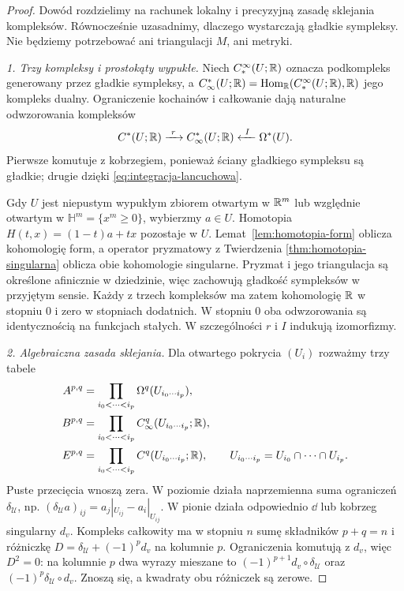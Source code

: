 \begin{proof}
Dowód rozdzielimy na rachunek lokalny i precyzyjną
zasadę sklejania kompleksów. Równocześnie uzasadnimy,
dlaczego wystarczają gładkie sympleksy. Nie będziemy
potrzebować ani triangulacji $M$, ani metryki.

\emph{1. Trzy kompleksy i prostokąty wypukłe.}
Niech $C_*^\infty(U;\mathbb{R})$ oznacza podkompleks
generowany przez gładkie sympleksy, a
$C_\infty^*(U;\mathbb{R})=\operatorname{Hom}_{\mathbb{R}}
(C_*^\infty(U;\mathbb{R}),\mathbb{R})$ jego kompleks dualny.
Ograniczenie kochainów i całkowanie dają naturalne
odwzorowania kompleksów
\[
 C^*(U;\mathbb{R})\xrightarrow{\ r\ }C_\infty^*(U;\mathbb{R})
 \xleftarrow{\ I\ }\Omega^*(U).
\]
Pierwsze komutuje z kobrzegiem, ponieważ ściany
gładkiego sympleksu są gładkie; drugie dzięki
\eqref{eq:integracja-lancuchowa}.

Gdy $U$ jest niepustym wypukłym zbiorem otwartym
w $\mathbb{R}^m$ lub względnie otwartym w
$\mathbb H^m=\{x^m\geq0\}$, wybierzmy $a\in U$.
Homotopia $H(t,x)=(1-t)a+tx$ pozostaje w $U$.
Lemat~\ref{lem:homotopia-form} oblicza kohomologię
form, a operator pryzmatowy z Twierdzenia
\ref{thm:homotopia-singularna} oblicza obie kohomologie
singularne. Pryzmat i jego triangulacja są określone
afinicznie w dziedzinie, więc zachowują gładkość
sympleksów w przyjętym sensie. Każdy z trzech
kompleksów ma zatem kohomologię $\mathbb{R}$ w stopniu $0$
i zero w stopniach dodatnich. W stopniu $0$ oba
odwzorowania są identycznością na funkcjach stałych.
W szczególności $r$ i $I$ indukują izomorfizmy.

\emph{2. Algebraiczna zasada sklejania.}
Dla otwartego pokrycia $(U_i)$ rozważmy trzy tabele
\[
 \begin{aligned}
 A^{p,q}&=\prod_{i_0<\cdots<i_p}\Omega^q(U_{i_0\cdots i_p}),\\
 B^{p,q}&=\prod_{i_0<\cdots<i_p}C_\infty^q(U_{i_0\cdots i_p};\mathbb{R}),\\
 E^{p,q}&=\prod_{i_0<\cdots<i_p}C^q(U_{i_0\cdots i_p};\mathbb{R}),
 \qquad U_{i_0\cdots i_p}=U_{i_0}\cap\cdots\cap U_{i_p}.
 \end{aligned}
\]
Puste przecięcia wnoszą zera. W poziomie działa
naprzemienna suma ograniczeń $\delta_{\mathcal U}$,
np. $(\delta_{\mathcal U}a)_{ij}=a_j|_{U_{ij}}-a_i|_{U_{ij}}$.
W pionie działa odpowiednio $\dd$ lub kobrzeg singularny
$d_v$. Kompleks całkowity ma w stopniu $n$ sumę
składników $p+q=n$ i różniczkę
$D=\delta_{\mathcal U}+(-1)^p d_v$ na kolumnie $p$.
Ograniczenia komutują z $d_v$, więc $D^2=0$:
na kolumnie $p$ dwa wyrazy mieszane to
$(-1)^{p+1}d_v\circ\delta_{\mathcal U}$ oraz
$(-1)^p\delta_{\mathcal U}\circ d_v$.
Znoszą się, a kwadraty obu różniczek są zerowe.


\end{proof}
